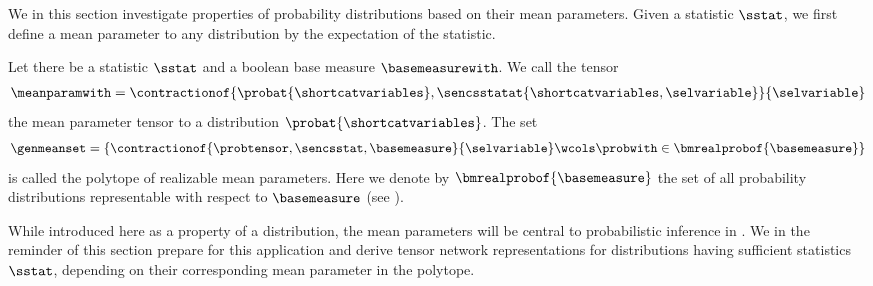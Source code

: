 

We in this section investigate properties of probability distributions based on their mean parameters.
Given a statistic $\sstat$, we first define a mean parameter to any distribution by the expectation of the statistic.

\begin{definition}
    \label{def:meanPolytope}
    Let there be a statistic $\sstat$ and a boolean base measure $\basemeasurewith$.
    We call the tensor
    \begin{align*}
        \meanparamwith
        = \contractionof{\probat{\shortcatvariables},\sencsstatat{\shortcatvariables,\selvariable}}{\selvariable}
    \end{align*}
    the mean parameter tensor to a distribution $\probat{\shortcatvariables}$.
    The set
    \begin{align*}
        \genmeanset
        = \left\{\contractionof{\probtensor,\sencsstat,\basemeasure}{\selvariable}\wcols\probwith\in\bmrealprobof{\basemeasure} \right\}
    \end{align*}
    is called the polytope of realizable mean parameters.
    Here we denote by $\bmrealprobof{\basemeasure}$ the set of all probability distributions representable with respect to $\basemeasure$ (see ).
\end{definition}

While introduced here as a property of a distribution, the mean parameters will be central to probabilistic inference in .
We in the reminder of this section prepare for this application and derive tensor network representations for distributions having sufficient statistics $\sstat$, depending on their corresponding mean parameter in the polytope.


\label{sec:meanPolytopeConvexHull}

